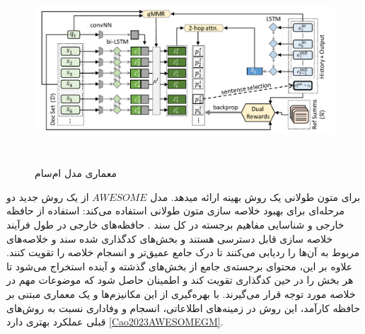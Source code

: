 \begin{figure}[!h]
	\begin{center}
		\includegraphics[height=7cm]{query-assited.png}
	\end{center}
	\caption{ معماری مدل  ام‌سام \cite{shapira-etal-2022-interactive}} 
	\label{fig:MSumm}
	
	\medskip
	
\end{figure}








برای متون طولانی یک روش بهینه ارائه میدهد.
مدل $ AWESOME $ از یک روش جدید دو مرحله‌ای برای بهبود خلاصه سازی متون طولانی استفاده می‌کند: استفاده از حافظه خارجی و شناسایی مفاهیم برجسته در کل سند
. حافظه‌های خارجی در طول فرآیند خلاصه سازی قابل دسترسی هستند و بخش‌های کدگذاری شده سند و خلاصه‌های مربوط به آن‌ها را ردیابی می‌کنند تا درک جامع عمیق‌تر و انسجام خلاصه را تقویت کنند. علاوه بر این، محتوای برجسته‌ی جامع از بخش‌های گذشته و آینده استخراج می‌شود تا هر بخش را در حین کدگذاری تقویت کند و اطمینان حاصل شود که موضوعات مهم در خلاصه مورد توجه قرار می‌گیرند. با بهره‌گیری از این مکانیزم‌ها و یک معماری مبتنی بر حافظه کارآمد، این روش در زمینه‌های اطلاعاتی، انسجام و وفاداری نسبت به روش‌های قبلی عملکرد بهتری دارد
\ref{Cao2023AWESOMEGM}.

